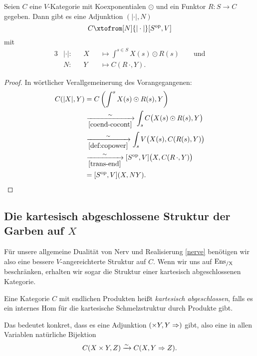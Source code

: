 \begin{theorem} 
  \label{nerve}
  Seien $C$ eine $V$-Kategorie mit Koexponentialen $\odot$ und ein
  Funktor $R: S \to C$ gegeben. Dann gibt es eine Adjunktion
  $(|\cdot|, N)$
  \[ C \xtofrom[N]{|\cdot|} [S\op, V] \]
  mit
  \begin{alignat*}{3}
    &|\cdot|: && X &&\mapsto \int^{s \in S} X(s) \odot R(s) \qquad \text{und} \\
    &N: && Y &&\mapsto C(R \, \cdot, Y).
  \end{alignat*}
\end{theorem}
\begin{proof}
  In wörtlicher Verallgemeinerung des Vorangegangenen:
  \begin{align*}
     C(|X|, Y)
     &= C \left( \int^s X(s) \odot R(s), Y \right) \\
     & \xrightarrow[\ref{coend-cocont}]{\sim}
       \int_s C \big( X(s) \odot R(s), Y \big) \\
     & \xrightarrow[\ref{def:copower}]{\sim}
       \int_s V \big( X(s), C(R(s), Y) \big) \\
     & \xrightarrow[\ref{trans-end}]{\sim}
       [S^\mathrm{op}, V] \big( X, C(R \, \cdot, Y) \big) \\
     &= [S^\mathrm{op}, V] (X, NY).
  \end{align*}
\end{proof}

\subsection{Die kartesisch abgeschlossene Struktur der Garben auf $X$}
\label{sec:ensx-cart-closed}

Für unsere allgemeine Dualität von Nerv und Realisierung \ref{nerve}
benötigen wir also eine bessere $V$-angereichterte Struktur auf
$C$. Wenn wir uns auf $\operatorname{Ens_{/X}}$ beschränken, erhalten wir sogar die
Struktur einer kartesisch abgeschlossenen Kategorie.
\begin{defn}
  Eine Kategorie $C$ mit endlichen Produkten heißt \emph{kartesisch
    abgeschlossen}, falls es ein internes Hom für die kartesische
  Schmelzstruktur durch Produkte gibt.
\end{defn}
Das bedeutet konkret, dass es eine Adjunktion $(\times Y, Y \Rightarrow)$
gibt, also eine in allen Variablen natürliche Bijektion
\[ C(X \times Y, Z) \xrightarrow[]{\sim} C(X, Y \Rightarrow Z). \]

